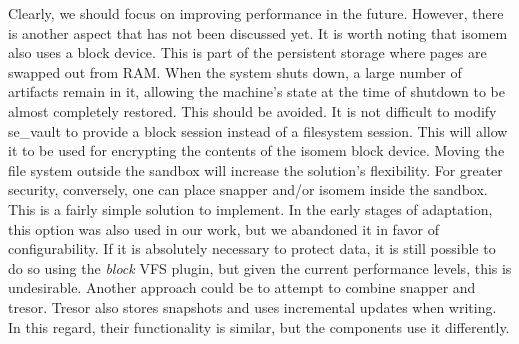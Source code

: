 Clearly, we should focus on improving performance in the future. However, there is another aspect that has not been discussed yet. It is worth noting that isomem also uses a block device. This is part of the persistent storage where pages are swapped out from RAM. When the system shuts down, a large number of artifacts remain in it, allowing the machine’s state at the time of shutdown to be almost completely restored. This should be avoided. It is not difficult to modify se\_vault to provide a block session instead of a filesystem session. This will allow it to be used for encrypting the contents of the isomem block device. Moving the file system outside the sandbox will increase the solution’s flexibility. For greater security, conversely, one can place snapper and/or isomem inside the sandbox. This is a fairly simple solution to implement. In the early stages of adaptation, this option was also used in our work, but we abandoned it in favor of configurability. If it is absolutely necessary to protect data, it is still possible to do so using the \textit{block} VFS plugin, but given the current performance levels, this is undesirable. Another approach could be to attempt to combine snapper and tresor. Tresor also stores snapshots and uses incremental updates when writing. In this regard, their functionality is similar, but the components use it differently.
